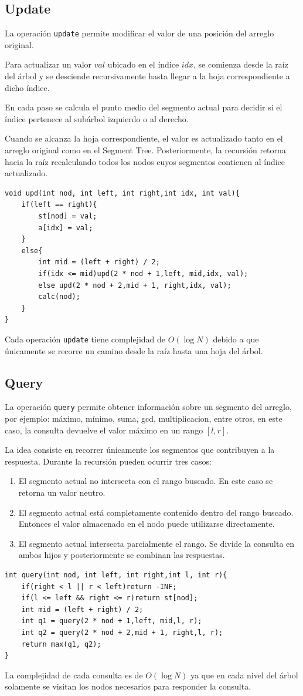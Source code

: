 \documentclass[12pt]{article}
\begin{document}
\subsection*{Update}
La operación \texttt{update} permite modificar el valor de una posición del arreglo original.\par
Para actualizar un valor $val$ ubicado en el índice $idx$, se comienza desde la raíz del árbol y se desciende recursivamente hasta llegar a la hoja correspondiente a dicho índice.\par
En cada paso se calcula el punto medio del segmento actual para decidir si el índice pertenece al subárbol izquierdo o al derecho.\par
Cuando se alcanza la hoja correspondiente, el valor es actualizado tanto en el arreglo original como en el Segment Tree. Posteriormente, la recursión retorna hacia la raíz recalculando todos los nodos cuyos segmentos contienen al índice actualizado.
\begin{lstlisting}
void upd(int nod, int left, int right,int idx, int val){
    if(left == right){
        st[nod] = val;
        a[idx] = val;
    }
    else{
        int mid = (left + right) / 2;
        if(idx <= mid)upd(2 * nod + 1,left, mid,idx, val);
        else upd(2 * nod + 2,mid + 1, right,idx, val);
        calc(nod);
    }
}
\end{lstlisting}
Cada operación \texttt{update} tiene complejidad de $O(\log N)$ debido a que únicamente se recorre un camino desde la raíz hasta una hoja del árbol.
\subsection*{Query}
La operación \texttt{query} permite obtener información sobre un segmento del arreglo, por ejemplo: máximo, mínimo, suma, gcd, multiplicacion, entre otros, en este caso, la consulta devuelve el valor máximo en un rango $[l,r]$.\par
La idea consiste en recorrer únicamente los segmentos que contribuyen a la respuesta. Durante la recursión pueden ocurrir tres casos:
\begin{enumerate}
    \item El segmento actual no intersecta con el rango buscado. En este caso se retorna un valor neutro.
    \item El segmento actual está completamente contenido dentro del rango buscado. Entonces el valor almacenado en el nodo puede utilizarse directamente.
    \item El segmento actual intersecta parcialmente el rango. Se divide la consulta en ambos hijos y posteriormente se combinan las respuestas.
\end{enumerate}
\begin{lstlisting}
int query(int nod, int left, int right,int l, int r){
    if(right < l || r < left)return -INF;
    if(l <= left && right <= r)return st[nod];
    int mid = (left + right) / 2;
    int q1 = query(2 * nod + 1,left, mid,l, r);
    int q2 = query(2 * nod + 2,mid + 1, right,l, r);
    return max(q1, q2);
}
\end{lstlisting}
La complejidad de cada consulta es de $O(\log N)$ ya que en cada nivel del árbol solamente se visitan los nodos necesarios para responder la consulta.
\end{document}
